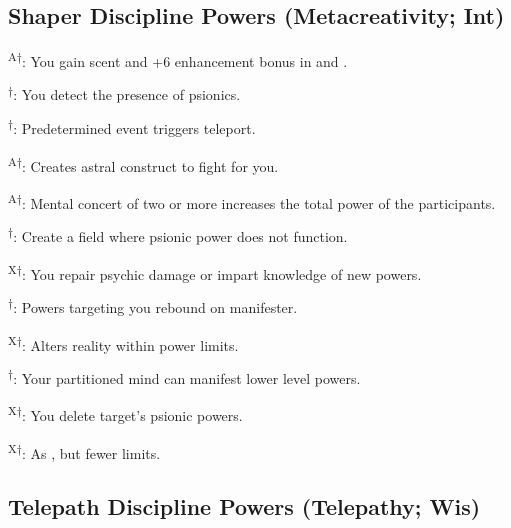 \subsection{Shaper Discipline Powers {\normalsize(Metacreativity; Int)}}
\begin{enumerate*}
\item {}\textsuperscript{A$\dagger$}: You gain scent and +6 enhancement bonus in  and .

\item {}\textsuperscript{$\dagger$}: You detect the presence of psionics.

\textsuperscript{$\dagger$}: Predetermined event triggers teleport.

\item
\item
\item {}\textsuperscript{A$\dagger$}: Creates astral construct to fight for you.

\textsuperscript{A$\dagger$}: Mental concert of two or more increases the total power of the participants.

\item {}\textsuperscript{$\dagger$}: Create a field where psionic power does not function.
\item {}\textsuperscript{X$\dagger$}: You repair psychic damage or impart knowledge of new powers.

\textsuperscript{$\dagger$}: Powers targeting you rebound on manifester.

\item {}\textsuperscript{X$\dagger$}: Alters reality within power limits.

\textsuperscript{$\dagger$}: Your partitioned mind can manifest lower level powers.

\item {}\textsuperscript{X$\dagger$}: You delete target's psionic powers.

\textsuperscript{X$\dagger$}: As , but fewer limits.
\end{enumerate*}



\subsection{Telepath Discipline Powers {\normalsize(Telepathy; Wis)}}
\begin{enumerate*}
\item
\item
\item
\item
\item
\item
\item
\item
\item
\end{enumerate*}